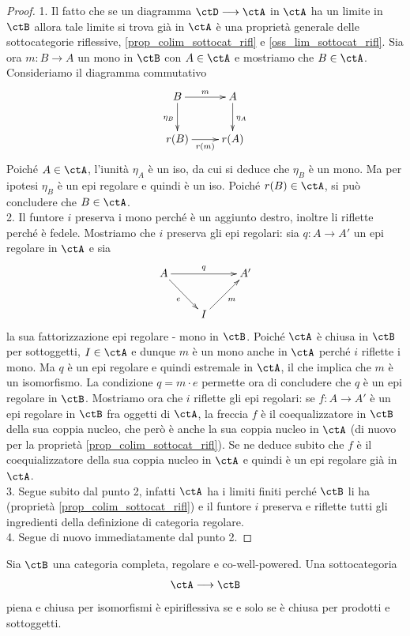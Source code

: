 \begin{proof}
 1. Il fatto che se un diagramma \(\ctD \fun \ctA\) in \(\ctA\) ha un limite in \(\ctB\) allora tale limite si trova già in \(\ctA\)
 è una proprietà generale delle sottocategorie riflessive, \ref{prop_colim_sottocat_rifl} e \ref{oss_lim_sottocat_rifl}. Sia ora \(m \colon B \to A\) un mono in \(\ctB\) con \(A \in \ctA\) e mostriamo che \(B \in \ctA\).
 Consideriamo il diagramma commutativo
 \[\xymatrix{B \ar[r]^-{m} \ar[d]_{\eta_B} & A \ar[d]^{\eta_A} \\ r(B) \ar[r]_-{r(m)} & r(A)}\]
 Poiché \(A \in \ctA\), l'iunità \(\eta_A\) è un iso, da cui si deduce che \(\eta_B\) è un mono. Ma per ipotesi \(\eta_B\) è un epi
 regolare e quindi è un iso. Poiché \(r(B) \in \ctA\), si può concludere che \(B \in \ctA\). \\
 2. Il funtore \(i\) preserva i mono perché è un aggiunto destro, inoltre li riflette perché è fedele.
 Mostriamo che \(i\) preserva gli epi regolari: sia \(q \colon A \to A'\) un epi regolare in \(\ctA\) e sia
 \[\xymatrix{A \ar[rr]^-{q} \ar[rd]_{e} & & A' \\ & I \ar[ru]_{m}}\]
 la sua fattorizzazione epi regolare - mono in \(\ctB\). Poiché \(\ctA\) è chiusa in \(\ctB\) per sottoggetti, \(I \in \ctA\) e dunque \(m\) è
 un mono anche in \(\ctA\) perché \(i\) riflette i mono. Ma \(q\) è un epi regolare e quindi estremale in \(\ctA\), il che implica che \(m\)
 è un isomorfismo. La condizione \(q = m \cdot e\) permette ora di concludere che \(q\) è un epi regolare in \(\ctB\).
 Mostriamo ora che \(i\) riflette gli epi regolari: se \(f \colon A \to A'\) è un epi regolare in \(\ctB\) fra oggetti di \(\ctA\), la freccia
 \(f\) è il coequalizzatore in \(\ctB\) della sua coppia nucleo, che però è anche la sua coppia nucleo in \(\ctA\) (di nuovo per
 la proprietà \ref{prop_colim_sottocat_rifl}). Se ne deduce subito che \(f\) è il coequializzatore della sua coppia nucleo in \(\ctA\)
 e quindi è un epi regolare già in \(\ctA\). \\
 3. Segue subito dal punto 2, infatti \(\ctA\) ha i limiti finiti perché \(\ctB\) li ha (proprietà \ref{prop_colim_sottocat_rifl}) e il funtore \(i\)
 preserva e riflette tutti gli ingredienti della definizione di categoria regolare. \\
 4. Segue di nuovo immediatamente dal punto 2.
\end{proof}

\begin{lemma}\label{lemma_caract_epirifl}
 Sia \(\ctB\) una categoria completa, regolare e co-well-powered. Una sottocategoria
 \[\ctA \fun \ctB\]
 piena e chiusa per isomorfismi è epiriflessiva se e solo se è chiusa per prodotti e sottoggetti.
\end{lemma}

